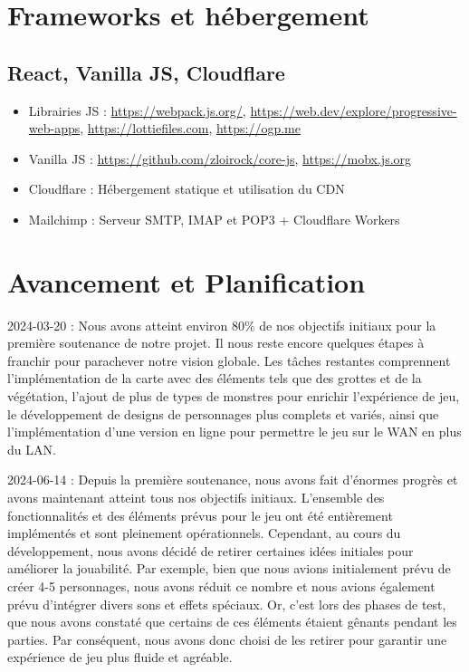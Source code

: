 \documentclass[
	article,			%
	11pt,				%
	oneside,			%
	a4paper,			%
	chapter=TITLE,
	french,			%
	sumario=tradicional
	]{base_nt}
\begin{document}
\newpage

\section{Frameworks et hébergement}

\subsection{React, Vanilla JS, Cloudflare}

\begin{itemize}
    \item Librairies JS :  \url{https://webpack.js.org/}, \url{https://web.dev/explore/progressive-web-apps}, \url{https://lottiefiles.com}, \url{https://ogp.me}
    \item Vanilla JS : \url{https://github.com/zloirock/core-js}, \url{https://mobx.js.org}
\end{itemize}

\begin{itemize}
    \item Cloudflare : Hébergement statique et utilisation du CDN
    \item Mailchimp : Serveur SMTP, IMAP et POP3 + Cloudflare Workers
\end{itemize}

\newpage

\section{Avancement et Planification}

2024-03-20 : Nous avons atteint environ 80\% de nos objectifs initiaux pour la première soutenance de notre projet. Il nous reste encore quelques étapes à franchir pour parachever notre vision globale. Les tâches restantes comprennent l'implémentation de la carte avec des éléments tels que des grottes et de la végétation, l'ajout de plus de types de monstres pour enrichir l'expérience de jeu, le développement de designs de personnages plus complets et variés, ainsi que l'implémentation d'une version en ligne pour permettre le jeu sur le WAN en plus du LAN.

2024-06-14 : Depuis la première soutenance, nous avons fait d'énormes progrès et avons maintenant atteint tous nos objectifs initiaux. L'ensemble des fonctionnalités et des éléments prévus pour le jeu ont été entièrement implémentés et sont pleinement opérationnels. Cependant, au cours du développement, nous avons décidé de retirer certaines idées initiales pour améliorer la jouabilité. Par exemple, bien que nous avions initialement prévu de créer 4-5 personnages, nous avons réduit ce nombre et nous avions également prévu d'intégrer divers sons et effets spéciaux. Or, c'est lors des phases de test, que nous avons constaté que certains de ces éléments étaient gênants pendant les parties. Par conséquent, nous avons donc choisi de les retirer pour garantir une expérience de jeu plus fluide et agréable.
\end{document}
